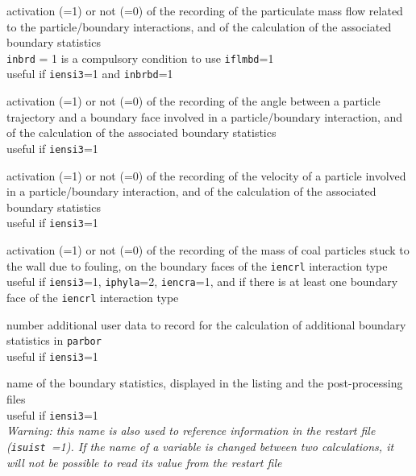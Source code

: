{activation (=1) or not (=0) of the recording of the particulate mass flow
related to the particle/boundary interactions, and of the calculation of
the associated boundary statistics\\
\texttt{inbrd} = 1 is a compulsory condition to use \texttt{iflmbd}=1\\
useful if \texttt{iensi3}=1 and \texttt{inbrbd}=1}


{activation (=1) or not (=0) of the recording of the angle between a
particle trajectory and a boundary face involved in a particle/boundary
interaction, and of the calculation of the associated boundary statistics\\
useful if \texttt{iensi3}=1}

{activation (=1) or not (=0) of the recording of the velocity of a particle
involved in a particle/boundary interaction, and of the calculation of
the associated boundary statistics\\
useful if \texttt{iensi3}=1}

{activation (=1) or not (=0) of the recording of the mass of coal particles
stuck to the wall due to fouling, on the boundary faces of the \texttt{iencrl}
interaction type\\
useful if \texttt{iensi3}=1, \texttt{iphyla}=2, \texttt{iencra}=1, and if
there is at least one boundary face of the \texttt{iencrl} interaction
type}

{number additional user data to record for the calculation
of additional boundary statistics in \texttt{parbor}\\
useful if \texttt{iensi3}=1}

{name of the boundary statistics, displayed in the listing
and the post-processing files\\
useful if \texttt{iensi3}=1\\
{\em Warning: this name is also used to reference information in the restart file
\mbox{(\texttt{isuist} =1)}. If the name of a variable is changed between two
calculations, it will not be possible to read its value from the restart file}}

